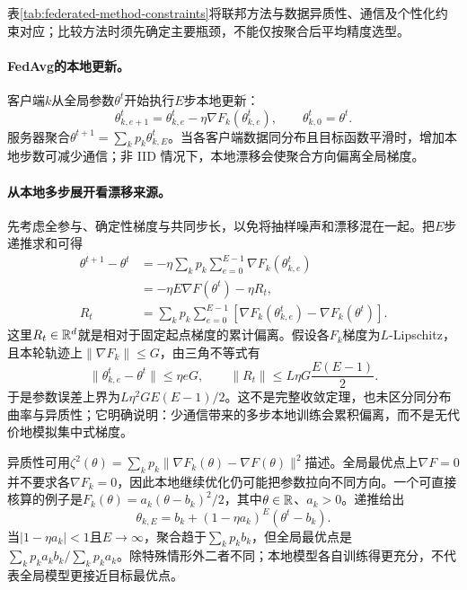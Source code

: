 表\ref{tab:federated-method-constraints}将联邦方法与数据异质性、通信及个性化约束对应；比较方法时须先确定主要瓶颈，不能仅按聚合后平均精度选型。
\paragraph{FedAvg的本地更新。}
客户端$k$从全局参数$\theta^t$开始执行$E$步本地更新：
\begin{equation}
 \theta_{k,e+1}^{t}=\theta_{k,e}^{t}-\eta\nabla F_k(\theta_{k,e}^{t}),
 \qquad \theta_{k,0}^{t}=\theta^t.
\end{equation}
服务器聚合$\theta^{t+1}=\sum_kp_k\theta_{k,E}^t$。当各客户端数据同分布且目标函数平滑时，增加本地步数可减少通信；非 IID 情况下，本地漂移会使聚合方向偏离全局梯度。

\paragraph{从本地多步展开看漂移来源。}
先考虑全参与、确定性梯度与共同步长，以免将抽样噪声和漂移混在一起。把$E$步递推求和可得
\begin{align}
 \theta^{t+1}-\theta^t
 &=-\eta\sum_kp_k\sum_{e=0}^{E-1}\nabla F_k(\theta_{k,e}^t)\\
 &=-\eta E\nabla F(\theta^t)-\eta R_t,\\
 R_t&=\sum_kp_k\sum_{e=0}^{E-1}
 [\nabla F_k(\theta_{k,e}^t)-\nabla F_k(\theta^t)].
\end{align}
这里$R_t\in\mathbb{R}^d$就是相对于固定起点梯度的累计偏离。假设各$F_k$梯度为$L$-Lipschitz，且本轮轨迹上$\|\nabla F_k\|\leq G$，由三角不等式有
\begin{equation}
 \|\theta_{k,e}^t-\theta^t\|\leq\eta eG,
 \qquad \|R_t\|\leq L\eta G\frac{E(E-1)}2.
\end{equation}
于是参数误差上界为$L\eta^2GE(E-1)/2$。这不是完整收敛定理，也未区分同分布曲率与异质性；它明确说明：少通信带来的多步本地训练会累积偏离，而不是无代价地模拟集中式梯度。

异质性可用$\zeta^2(\theta)=\sum_kp_k\|\nabla F_k(\theta)-\nabla F(\theta)\|^2$描述。全局最优点上$\nabla F=0$并不要求各$\nabla F_k=0$，因此本地继续优化仍可能把参数拉向不同方向。一个可直接核算的例子是$F_k(\theta)=a_k(\theta-b_k)^2/2$，其中$\theta\in\mathbb{R}$、$a_k>0$。递推给出
\begin{equation}
 \theta_{k,E}=b_k+(1-\eta a_k)^E(\theta^t-b_k).
\end{equation}
当$|1-\eta a_k|<1$且$E\to\infty$，聚合趋于$\sum_kp_kb_k$，但全局最优点是$\sum_kp_ka_kb_k/\sum_kp_ka_k$。除特殊情形外二者不同；本地模型各自训练得更充分，不代表全局模型更接近目标最优点。

